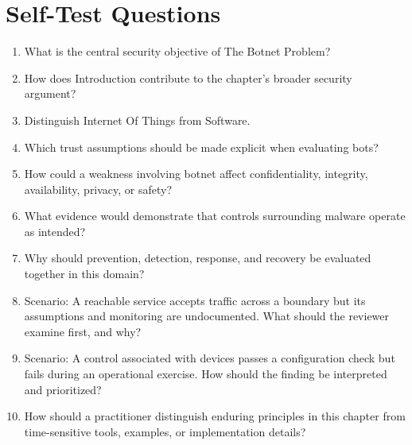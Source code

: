 \documentclass[11pt]{article}
\begin{document}
\section*{Self-Test Questions}
\begin{enumerate}
\item What is the central security objective of The Botnet Problem?
\item How does Introduction contribute to the chapter's broader security argument?
\item Distinguish Internet Of Things from Software.
\item Which trust assumptions should be made explicit when evaluating bots?
\item How could a weakness involving botnet affect confidentiality, integrity, availability, privacy, or safety?
\item What evidence would demonstrate that controls surrounding malware operate as intended?
\item Why should prevention, detection, response, and recovery be evaluated together in this domain?
\item Scenario: A reachable service accepts traffic across a boundary but its assumptions and monitoring are undocumented. What should the reviewer examine first, and why?
\item Scenario: A control associated with devices passes a configuration check but fails during an operational exercise. How should the finding be interpreted and prioritized?
\item How should a practitioner distinguish enduring principles in this chapter from time-sensitive tools, examples, or implementation details?
\end{enumerate}
\end{document}
